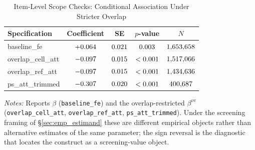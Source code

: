 \begin{table}[htbp]
\centering
\caption{Item-Level Scope Checks: Conditional Association Under Stricter Overlap}
\label{tab:item_level_scope_match}
\begin{threeparttable}
\small
\begin{tabular}{lcccc}
\toprule
Specification & Coefficient & SE & $p$-value & $N$ \\
\midrule
baseline\_fe         & $+0.064$        & $0.021$        & $0.003$       & $1{,}653{,}658$ \\
overlap\_cell\_att   & $-0.097$     & $0.015$     & $<0.001$  & $1{,}517{,}066$ \\
overlap\_ref\_att    & $-0.097$  & $0.015$  & $<0.001$  & $1{,}434{,}636$ \\
ps\_att\_trimmed     & $-0.307$          & $0.020$          & $<0.001$  & $400{,}687$ \\
\bottomrule
\end{tabular}
\begin{tablenotes}
\footnotesize
\item \textit{Notes:} Reports $\beta$ (\texttt{baseline\_fe}) and the
overlap-restricted $\beta^{\text{ov}}$ (\texttt{overlap\_cell\_att},
\texttt{overlap\_ref\_att}, \texttt{ps\_att\_trimmed}). Under the
screening framing of \S\ref{sec:emp_estimand} these are different
empirical objects rather than alternative estimates of the same
parameter; the sign reversal is the diagnostic that locates the
construct as a screening-value object.
\end{tablenotes}
\end{threeparttable}
\end{table}
